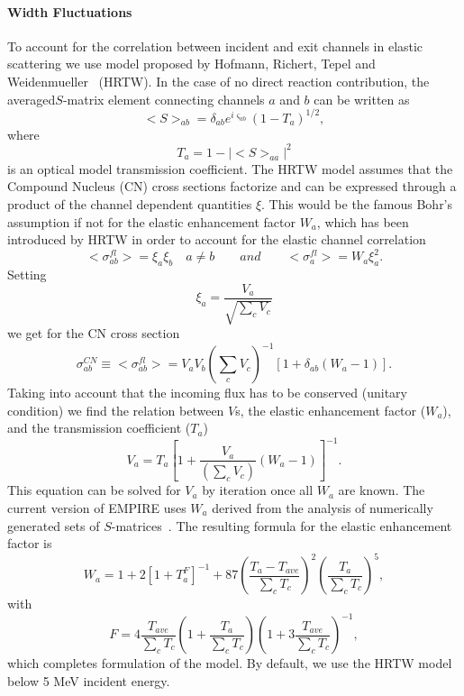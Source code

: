 \documentclass[twocolumn,amsmath,amssymb,10pt,groupedaddress,a4paper]{revtex4}
\begin{document}
\paragraph{Width Fluctuations}
To account for the correlation between incident and exit channels in
elastic scattering we use model proposed by Hofmann, Richert, Tepel
and Weidenmueller~\cite{HRTW} (HRTW). In the case of no direct reaction
contribution, the averaged$S$-matrix element connecting channels $a$ and
$b$ can be written as
\begin{equation}
<S>_{ab}=\delta_{ab}e^{i\varsigma_{ab}}(1-T_{a})^{1/2},
\label{Sab}
\end{equation}
\noindent where
\begin{equation}
T_{a}=1-|<S>_{aa}|^{2}
\label{Ta}
\end{equation}
is an optical model transmission coefficient. The HRTW model assumes
that the Compound Nucleus (CN) cross sections factorize and
can be expressed through a product of the channel dependent quantities
$\xi$. This would be the famous Bohr's assumption if not for the
elastic enhancement factor $W_{a}$, which has been introduced by
HRTW in order to account for the elastic channel correlation
\begin{equation}
<\sigma_{ab}^{fl}>=\xi_{a}\xi_{b}\quad a\neq b\qquad and\qquad<\sigma_{a}^{fl}>=W_{a}\xi_{a}^{2}.
\label{Sig-fluc}
\end{equation}
 Setting
\begin{equation}
\xi_{a}=\frac{V_{a}}{\sqrt{\sum_{c}V_{c}}}
\label{ksi}
\end{equation}
we get for the CN cross section
\begin{equation}
\sigma_{ab}^{CN}\equiv<\sigma_{ab}^{fl}>=V_{a}V_{b}\left(\sum_{c}V_{c}\right)^{-1}\left[1+\delta_{ab}\left(W_{a}-1\right)\right].
\label{Sig-flucV}
\end{equation}
Taking into account that the incoming flux has to be conserved (unitary
condition) we find the relation between $V$s, the elastic enhancement
factor ($W_{a}$), and the transmission coefficient ($T_{a}$)
\begin{equation}
V_{a}=T_{a}\left[1+\frac{V_{a}}{\left(\sum_{c}V_{c}\right)}\left(W_{a}-1\right)\right]^{-1}.
\label{Va}
\end{equation}
This equation can be solved for $V_{a}$ by iteration once all $W_{a}$
are known. The current version of EMPIRE uses $W_{a}$ derived from
the analysis of numerically generated sets of $S$-matrices~\cite{HHM}.
The resulting formula for the elastic enhancement factor is
\begin{equation}
W_{a}=1+2\left[1+T_{a}^{F}\right]^{-1}+87\left(\frac{T_{a}-T_{ave}}{\sum_{c}T_{c}}\right)^{2}\left(\frac{T_{a}}{\sum_{c}T_{c}}\right)^{5},
\label{Wa}
\end{equation}
with
\begin{equation}
F=4\frac{T_{ave}}{\sum_{c}T_{c}}\left(1+\frac{T_{a}}{\sum_{c}T_{c}}\right)\left(1+3\frac{T_{ave}}{\sum_{c}T_{c}}\right)^{-1},
\label{Wa-F}
\end{equation}
which completes formulation of the model.
By default, we use the HRTW model below 5 MeV incident
energy.
\end{document}
